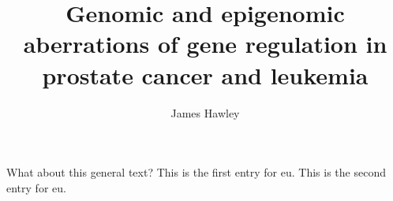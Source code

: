 \documentclass[oneside,doublespacing]{ut-thesis}
\author{James Hawley}
\title{Genomic and epigenomic aberrations of gene regulation in prostate cancer and leukemia}
\begin{document}
\frontmatter

% 
% 

% 
% 

\mainmatter
% 
What about this general text?
This is the first entry for \gls{eu}.
This is the second entry for \gls{eu}.

%

%

% 

% 

% 

% 
\backmatter
\printunsrtglossaries

\end{document}
